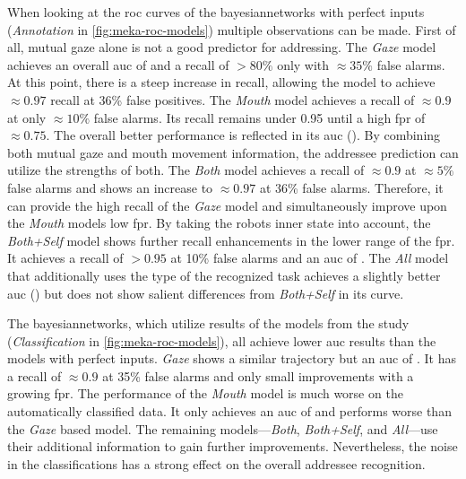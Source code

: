  When looking at the \gls{roc} curves of the \glspl{bayesiannetwork} with perfect inputs (\emph{Annotation} in \cref{fig:meka-roc-models}) multiple observations can be made.
First of all, mutual gaze alone is not a good predictor for addressing.
The \emph{Gaze} model achieves an overall \gls{auc} of  and a recall of \(>80\%\) only with \(\approx 35\%\) false alarms.
At this point, there is a steep increase in recall, allowing the model to achieve \(\approx 0.97\) recall at 36\% false positives.
The \emph{Mouth} model achieves a recall of \(\approx 0.9\) at only \(\approx 10\%\) false alarms.
Its recall remains under 0.95 until a high \acrfull{fpr} of \(\approx 0.75\). 
The overall better performance is reflected in its \gls{auc} ().
By combining both mutual gaze and mouth movement information, the \gls{addressee} prediction can utilize the strengths of both.
The \emph{Both} model achieves a recall of \(\approx 0.9\) at \(\approx 5\%\) false alarms and shows an increase to \(\approx 0.97\) at 36\% false alarms.
Therefore, it can provide the high recall of the \emph{Gaze} model and simultaneously improve upon the \emph{Mouth} models low \gls{fpr}.
By taking the \glspl{robot} inner state into account, the \emph{Both+Self} model shows further recall enhancements in the lower range of the \gls{fpr}.
It achieves a recall of \(> 0.95\) at 10\% false alarms and an \gls{auc} of .
The \emph{All} model that additionally uses the type of the recognized task achieves a slightly better \gls{auc} () but does not show salient differences from \emph{Both+Self} in its curve.

The \glspl{bayesiannetwork}, which utilize results of the models from the study (\emph{Classification} in \cref{fig:meka-roc-models}), all achieve lower \gls{auc} results than the models with perfect inputs.
\emph{Gaze} shows a similar trajectory but an \gls{auc} of .
It has a recall of \(\approx 0.9\) at 35\% false alarms and only small improvements with a growing \gls{fpr}.
The performance of the \emph{Mouth} model is much worse on the automatically classified data.
It only achieves an \gls{auc} of  and performs worse than the \emph{Gaze} based model.
The remaining models---\emph{Both}, \emph{Both+Self}, and \emph{All}---use their additional information to gain further improvements.
Nevertheless, the noise in the classifications has a strong effect on the overall \gls{addressee} recognition.

